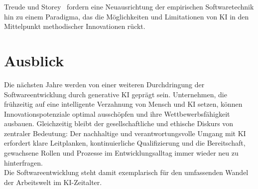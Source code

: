 Treude und Storey~\cite{treude_generative_2025} fordern eine Neuausrichtung der
empirischen Softwaretechnik hin zu einem Paradigma, das die Möglichkeiten und
Limitationen von KI in den Mittelpunkt methodischer Innovationen rückt.

\section{Ausblick}
Die nächsten Jahre werden von einer weiteren Durchdringung der
Softwareentwicklung durch generative KI geprägt sein. Unternehmen, die
frühzeitig auf eine intelligente Verzahnung von Mensch und KI setzen, können
Innovationspotenziale optimal ausschöpfen und ihre Wettbewerbsfähigkeit
ausbauen. Gleichzeitig bleibt der gesellschaftliche und ethische Diskurs von
zentraler Bedeutung: Der nachhaltige und verantwortungsvolle Umgang mit KI
erfordert klare Leitplanken, kontinuierliche Qualifizierung und die
Bereitschaft, gewachsene Rollen und Prozesse im Entwicklungsalltag immer wieder
neu zu hinterfragen.\\ Die Softwareentwicklung steht damit exemplarisch für den
umfassenden Wandel der Arbeitswelt im KI-Zeitalter.

% 

% 

% 